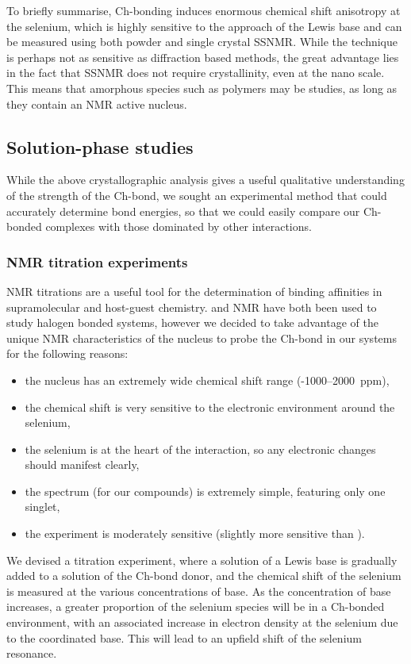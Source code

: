 \begin{refsection}
To briefly summarise, Ch-bonding induces enormous chemical shift anisotropy at the selenium, which is highly sensitive to the approach of the Lewis base and can be measured using both powder and single crystal SSNMR.
While the technique is perhaps not as sensitive as diffraction based methods, the great advantage lies in the fact that SSNMR does not require crystallinity, even at the nano scale.
This means that amorphous species such as polymers may be studies, as long as they contain an NMR active nucleus.

\subsection{Solution-phase studies}
While the above crystallographic analysis gives a useful qualitative understanding of the strength of the Ch-bond, we sought an experimental method that could accurately determine bond energies, so that we could easily compare our Ch-bonded complexes with those dominated by other interactions.

\subsubsection{NMR titration experiments}
NMR titrations are a useful tool for the determination of binding affinities in supramolecular and host-guest chemistry.
 and  NMR have both been used to study halogen bonded systems, however we decided to take advantage of the unique NMR characteristics of the  nucleus to probe the Ch-bond in our systems for the following reasons:

\begin{itemize}
    \item the nucleus has an extremely wide chemical shift range (-1000--2000~ppm),
    \item the chemical shift is very sensitive to the electronic environment around the selenium,
    \item the selenium is at the heart of the interaction, so any electronic changes should manifest clearly,
    \item the spectrum (for our compounds) is extremely simple, featuring only one singlet,
    \item the experiment is moderately sensitive (slightly more sensitive than ).
\end{itemize}

We devised a titration experiment, where a solution of a Lewis base is gradually added to a solution of the Ch-bond donor, and the chemical shift of the selenium is measured at the various concentrations of base.
As the concentration of base increases, a greater proportion of the selenium species will be in a Ch-bonded environment, with an associated increase in electron density at the selenium due to the coordinated base.
This will lead to an upfield shift of the selenium resonance.


\end{refsection}
